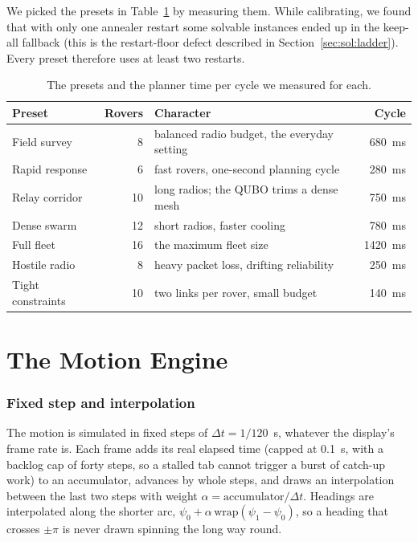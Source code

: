 We picked the presets in Table~\ref{tab:eng:presets} by measuring them. While
calibrating, we found that with only one annealer restart some solvable
instances ended up in the keep-all fallback (this is the restart-floor defect
described in Section~\ref{sec:sol:ladder}). Every preset therefore uses at
least two restarts.

\begin{table}[htbp]
\centering
\caption{The presets and the planner time per cycle we measured for each.}
\label{tab:eng:presets}
\small
\begin{tabularx}{\linewidth}{@{}l r X r@{}}
\toprule
Preset & Rovers & Character & Cycle \\
\midrule
Field survey & 8 & balanced radio budget, the everyday setting & 680~ms \\
Rapid response & 6 & fast rovers, one-second planning cycle & 280~ms \\
Relay corridor & 10 & long radios; the QUBO trims a dense mesh & 750~ms \\
Dense swarm & 12 & short radios, faster cooling & 780~ms \\
Full fleet & 16 & the maximum fleet size & 1420~ms \\
Hostile radio & 8 & heavy packet loss, drifting reliability & 250~ms \\
Tight constraints & 10 & two links per rover, small budget & 140~ms \\
\bottomrule
\end{tabularx}
\end{table}

\section{The Motion Engine}

\subsubsection{Fixed step and interpolation} The motion is simulated in fixed
steps of $\Delta t=1/120$~s, whatever the display's frame rate is. Each frame adds its real
elapsed time (capped at 0.1~s, with a backlog cap of forty steps, so a stalled
tab cannot trigger a burst of catch-up work) to an accumulator, advances by
whole steps, and draws an interpolation between the last two steps with weight
$\alpha=\text{accumulator}/\Delta t$. Headings are interpolated along the
shorter arc, $\psi_0+\alpha\,\mathrm{wrap}(\psi_1-\psi_0)$, so a heading that
crosses $\pm\pi$ is never drawn spinning the long way round.

